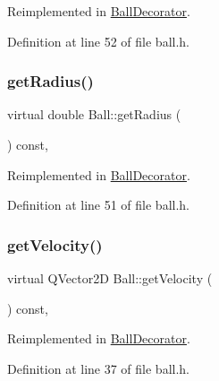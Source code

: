 Reimplemented in \mbox{\hyperlink{class_ball_decorator_a40b5df839e4f1aaec4ee792749757848}{Ball\+Decorator}}.



Definition at line 52 of file ball.\+h.

\mbox{\label{class_ball_a311b644cb28ee7c864806312ff52a594}} 
\subsubsection{\texorpdfstring{get\+Radius()}{getRadius()}}
{\footnotesize\ttfamily virtual double Ball\+::get\+Radius (\begin{DoxyParamCaption}{ }\end{DoxyParamCaption}) const\hspace{0.3cm}{\ttfamily [inline]}, {\ttfamily [virtual]}}



Reimplemented in \mbox{\hyperlink{class_ball_decorator_af842f5b568d3baa21fd68bb4ede7068a}{Ball\+Decorator}}.



Definition at line 51 of file ball.\+h.

\mbox{\label{class_ball_a016798bb733965c67e70b8abfc661e5b}} 
\subsubsection{\texorpdfstring{get\+Velocity()}{getVelocity()}}
{\footnotesize\ttfamily virtual Q\+Vector2D Ball\+::get\+Velocity (\begin{DoxyParamCaption}{ }\end{DoxyParamCaption}) const\hspace{0.3cm}{\ttfamily [inline]}, {\ttfamily [virtual]}}



Reimplemented in \mbox{\hyperlink{class_ball_decorator_aa2123d7419801968b7fce98e546397b7}{Ball\+Decorator}}.



Definition at line 37 of file ball.\+h.

\mbox{\label{class_ball_aacc57301046fab52930f7615073136e0}} 
